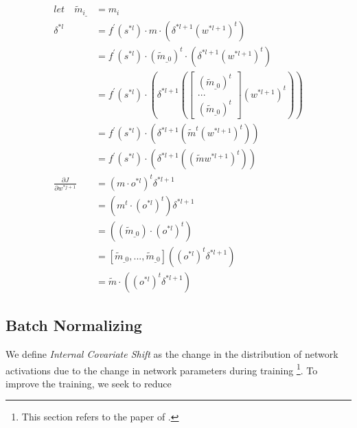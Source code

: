 \documentclass[runningheads,openany]{xhlPaper}
\begin{document}
\begin{equation}
\label{equ:drop_out_connect_relation}
\begin{aligned}
let \quad {{\tilde m}_{i\_}} &= {m_i}\\
{\delta ^{*l}} &= {f^{'}}\left( {{s^{*l}}} \right) \cdot m \cdot \left( {{\delta ^{*l + 1}}{{\left( {{w^{*l + 1}}} \right)}^t}} \right)\\
 &= {f^{'}}\left( {{s^{*l}}} \right) \cdot {\left( {{{\tilde m}_{\_0}}} \right)^t} \cdot \left( {{\delta ^{*l + 1}}{{\left( {{w^{*l + 1}}} \right)}^t}} \right)\\
 &= {f^{'}}\left( {{s^{*l}}} \right) \cdot \left( {{\delta ^{*l + 1}}\left( {\left[ {\begin{array}{*{20}{c}}
{{{\left( {{{\tilde m}_{\_0}}} \right)}^t}}\\
{...}\\
{{{\left( {{{\tilde m}_{\_0}}} \right)}^t}}
\end{array}} \right]{{\left( {{w^{*l + 1}}} \right)}^t}} \right)} \right)\\
 &= {f^{'}}\left( {{s^{*l}}} \right) \cdot \left( {{\delta ^{*l + 1}}\left( {{{\tilde m}^t}{{\left( {{w^{*l + 1}}} \right)}^t}} \right)} \right)\\
 &= {f^{'}}\left( {{s^{*l}}} \right) \cdot \left( {{\delta ^{*l + 1}}\left( {{{\left( {\tilde m{w^{*l + 1}}} \right)}^t}} \right)} \right)\\
\frac{{\partial J}}{{\partial {w^{*j + 1}}}} &= {\left( {m \cdot {o^{*l}}} \right)^t}{\delta ^{*l + 1}}\\
 &= \left( {{m^t} \cdot {{\left( {{o^{*l}}} \right)}^t}} \right){\delta ^{*l + 1}}\\
 &= \left( {\left( {{{\tilde m}_{\_0}}} \right) \cdot {{\left( {{o^{*l}}} \right)}^t}} \right)\\
 &= \left[ {{{\tilde m}_{\_0}},...,{{\tilde m}_{\_0}}} \right]\left( {{{\left( {{o^{*l}}} \right)}^t}{\delta ^{*l + 1}}} \right)\\
 &= \tilde m \cdot \left( {{{\left( {{o^{*l}}} \right)}^t}{\delta ^{*l + 1}}} \right)
\end{aligned}
\end{equation}

\subsection{Batch Normalizing}
We define \emph{Internal Covariate Shift} as the change in the distribution of network activations due to the change in network parameters during training \footnote{This section refers to the paper of \cite{Sergey_BatchNorm_2015}.}.
To improve the training, we seek to reduce
 
\end{document}
